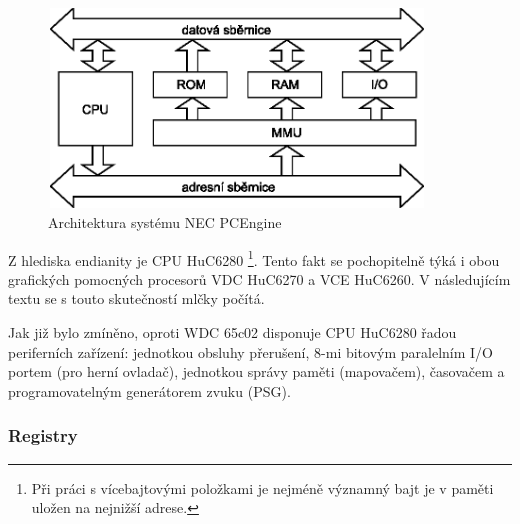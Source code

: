 \begin{figure}[ht]
\begin{center}
\includegraphics[width=10cm,height=5.3cm]{fig/pce_arch}
\caption{Architektura systému NEC PCEngine\label{fig:pce_arch}}
\end{center}
\end{figure}

Z hlediska endianity je CPU HuC6280 \footnote{Při práci s
vícebajtovými položkami je nejméně významný bajt je v paměti uložen na nejnižší
adrese.}. Tento fakt se pochopitelně týká i obou grafických pomocných procesorů
VDC HuC6270 a VCE HuC6260. V následujícím textu se s touto skutečností mlčky
počítá.

Jak již bylo zmíněno, oproti WDC 65c02 disponuje CPU HuC6280 řadou periferních
zařízení: jednotkou obsluhy přerušení, 8-mi bitovým paralelním I/O portem (pro
herní ovladač), jednotkou správy paměti (mapovačem), časovačem a
programovatelným generátorem zvuku (PSG).


\subsubsection{Registry}\label{chap:spec_hw_cpu_reg}

